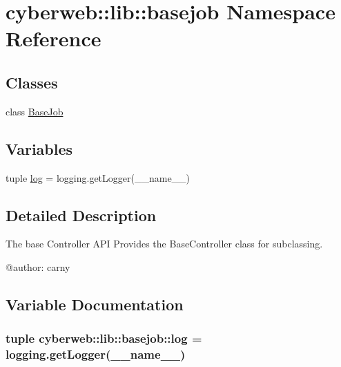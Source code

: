 \hypertarget{namespacecyberweb_1_1lib_1_1basejob}{\section{cyberweb\-:\-:lib\-:\-:basejob \-Namespace \-Reference}
\label{namespacecyberweb_1_1lib_1_1basejob}
}
\subsection*{\-Classes}
\begin{DoxyCompactItemize}
\item 
class \hyperlink{classcyberweb_1_1lib_1_1basejob_1_1_base_job}{\-Base\-Job}
\end{DoxyCompactItemize}
\subsection*{\-Variables}
\begin{DoxyCompactItemize}
\item 
tuple \hyperlink{namespacecyberweb_1_1lib_1_1basejob_acfbe7de8b795ea7ea01612f4727cd9f5}{log} = logging.\-get\-Logger(\-\_\-\-\_\-name\-\_\-\-\_\-)
\end{DoxyCompactItemize}


\subsection{\-Detailed \-Description}
\begin{DoxyVerb}
The base Controller API
Provides the BaseController class for subclassing.

    @author: carny
\end{DoxyVerb}
 

\subsection{\-Variable \-Documentation}
\hypertarget{namespacecyberweb_1_1lib_1_1basejob_acfbe7de8b795ea7ea01612f4727cd9f5}{
\subsubsection[{log}]{\setlength{\rightskip}{0pt plus 5cm}tuple {\bf cyberweb\-::lib\-::basejob\-::log} = logging.\-get\-Logger(\-\_\-\-\_\-name\-\_\-\-\_\-)}}\label{namespacecyberweb_1_1lib_1_1basejob_acfbe7de8b795ea7ea01612f4727cd9f5}
